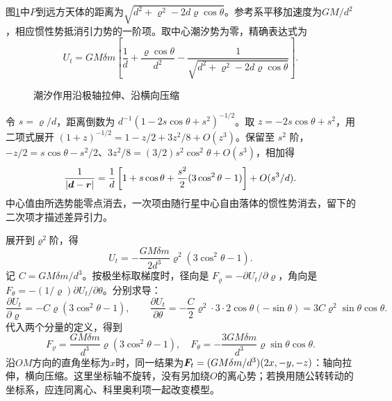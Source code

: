 \begin{solution}
图\ref{fig:hw8-7-s}中$P$到远方天体的距离为$\sqrt{d^2+\varrho^2-2d\varrho\cos\theta}$。参考系平移加速度为$GM/d^2$，相应惯性势抵消引力势的一阶项。取中心潮汐势为零，精确表达式为
\[
 U_t=GM\delta m\left[\frac1d+\frac{\varrho\cos\theta}{d^2}
 -\frac1{\sqrt{d^2+\varrho^2-2d\varrho\cos\theta}}\right].
\]

\begin{figure}[H]\centering
{}
\caption{潮汐作用沿极轴拉伸、沿横向压缩}\label{fig:hw8-7-s}
\end{figure}

令 $s=\varrho/d$，距离倒数为 $d^{-1}(1-2s\cos\theta+s^2)^{-1/2}$。取 $z=-2s\cos\theta+s^2$，用二项式展开 $(1+z)^{-1/2}=1-z/2+3z^2/8+O(z^3)$。保留至 $s^2$ 阶，$-z/2=s\cos\theta-s^2/2$、$3z^2/8=(3/2)s^2\cos^2\theta+O(s^3)$，相加得
\[
 \frac1{|\bm{d}-\bm{r}|}=\frac1d
 \left[1+s\cos\theta+\frac{s^2}{2}(3\cos^2\theta-1)\right]+O(s^3/d).
\]
中心值由所选势能零点消去，一次项由随行星中心自由落体的惯性势消去，留下的二次项才描述差异引力。

展开到$\varrho^2$阶，得
\[
 \boxed{U_t=-\frac{GM\delta m}{2d^3}\varrho^2(3\cos^2\theta-1)}.
\]
记 $C=GM\delta m/d^3$。按极坐标取梯度时，径向是 $F_\varrho=-\partial U_t/\partial\varrho$，角向是 $F_\theta=-(1/\varrho)\partial U_t/\partial\theta$。分别求导：
\[
\frac{\partial U_t}{\partial\varrho}=-C\varrho(3\cos^2\theta-1),\qquad
\frac{\partial U_t}{\partial\theta}
=-\frac C2\varrho^2\cdot3\cdot2\cos\theta(-\sin\theta)
=3C\varrho^2\sin\theta\cos\theta.
\]
代入两个分量的定义，得到
\[
 \boxed{F_\varrho=\frac{GM\delta m}{d^3}\varrho(3\cos^2\theta-1),\quad
 F_\theta=-\frac{3GM\delta m}{d^3}\varrho\sin\theta\cos\theta}.
\]
沿$OM$方向的直角坐标为$x$时，同一结果为$\bm{F}_t=(GM\delta m/d^3)(2x,-y,-z)$：轴向拉伸，横向压缩。这里坐标轴不旋转，没有另加绕$O$的离心势；若换用随公转转动的坐标系，应连同离心、科里奥利项一起改变模型。


\end{solution}



